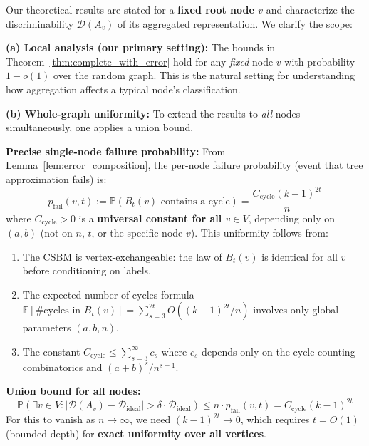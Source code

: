 \begin{remark}
\label{rem:single_vs_whole}
Our theoretical results are stated for a \textbf{fixed root node $v$} and characterize the discriminability $\mathcal{D}(A_v)$ of its aggregated representation. We clarify the scope:

\textbf{(a) Local analysis (our primary setting):} The bounds in Theorem~\ref{thm:complete_with_error} hold for any \textit{fixed} node $v$ with probability $1 - o(1)$ over the random graph. This is the natural setting for understanding how aggregation affects a typical node's classification.

\textbf{(b) Whole-graph uniformity:} To extend the results to \textit{all} nodes simultaneously, one applies a union bound.

\textbf{Precise single-node failure probability:} From Lemma~\ref{lem:error_composition}, the per-node failure probability (event that tree approximation fails) is:
\begin{equation}
    p_{\mathrm{fail}}(v, t) := \mathbb{P}(B_t(v) \text{ contains a cycle}) = \frac{C_{\mathrm{cycle}} (k-1)^{2t}}{n}
\end{equation}
where $C_{\mathrm{cycle}} > 0$ is a \textbf{universal constant for all $v \in V$}, depending only on $(a, b)$ (not on $n$, $t$, or the specific node $v$). This uniformity follows from:
\begin{enumerate}
    \item The CSBM is vertex-exchangeable: the law of $B_t(v)$ is identical for all $v$ before conditioning on labels.
    \item The expected number of cycles formula $\mathbb{E}[\#\text{cycles in } B_t(v)] = \sum_{s=3}^{2t} O((k-1)^{2t}/n)$ involves only global parameters $(a, b, n)$.
    \item The constant $C_{\mathrm{cycle}} \leq \sum_{s=3}^{\infty} c_s$ where $c_s$ depends only on the cycle counting combinatorics and $(a+b)^s/n^{s-1}$.
\end{enumerate}

\textbf{Union bound for all nodes:}
\begin{equation}
    \mathbb{P}\left(\exists v \in V: |\mathcal{D}(A_v) - \mathcal{D}_{\mathrm{ideal}}| > \delta \cdot \mathcal{D}_{\mathrm{ideal}}\right) \leq n \cdot p_{\mathrm{fail}}(v, t) = C_{\mathrm{cycle}} (k-1)^{2t}
\end{equation}
For this to vanish as $n \to \infty$, we need $(k-1)^{2t} \to 0$, which requires $t = O(1)$ (bounded depth) for \textbf{exact uniformity over all vertices}.


\end{remark}
